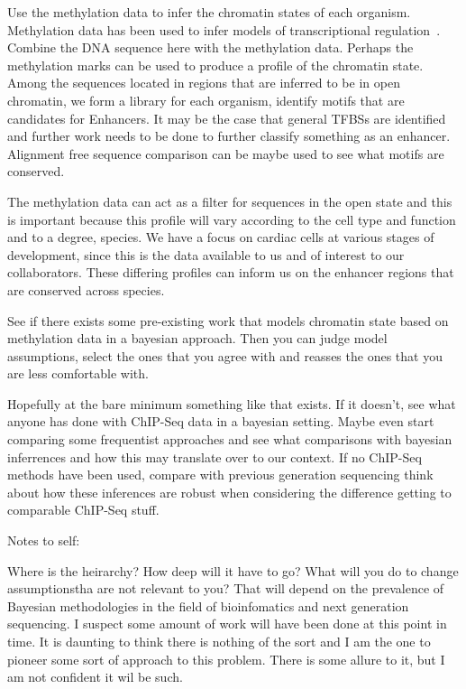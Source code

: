 Use the methylation data to infer the chromatin states of each organism. Methylation data has been used to infer models of transcriptional regulation~\cite{duren2017modeling}. Combine the DNA sequence here with the methylation data. 
Perhaps the methylation marks can be used to produce a profile of the chromatin state. 
Among the sequences located in regions that are inferred to be in open chromatin, we form a library for each organism, identify motifs that are candidates for Enhancers. It may be the case that general TFBSs are identified and further work needs to be done to further classify something as an enhancer. Alignment free sequence comparison can be maybe used to see what motifs are conserved. 

The methylation data can act as a filter for sequences in the open state and this is important because this profile will vary according to the cell type and function and to a degree, species. We have a focus on cardiac cells at various stages of development, since this is the data available to us and of interest to our collaborators. These differing profiles can inform us on the enhancer regions that are conserved across species. 

See if there exists some pre-existing work that models chromatin state based on methylation data in a bayesian approach. Then you can judge model assumptions, select the ones that you agree with and reasses the ones that you are less comfortable with. 

Hopefully at the bare minimum something like that exists. If it doesn't, see what anyone has done with ChIP-Seq data in a bayesian setting. Maybe even start comparing some frequentist approaches and see what comparisons with bayesian inferrences and how this may translate over to our context. If no ChIP-Seq methods have been used, compare with previous generation sequencing think about how these inferences are robust when considering the difference getting to comparable ChIP-Seq stuff. 

Notes to self:

Where is the heirarchy? How deep will it have to go? What will you do to change assumptionstha are not relevant to you? That will depend on the prevalence of Bayesian methodologies in the field of bioinfomatics and next generation sequencing. I suspect some amount of work will have been done at this point in time. It is daunting to think there is nothing of the sort and I am the one to pioneer some sort of approach to this problem. There is some allure to it, but I am not confident it wil be such. 